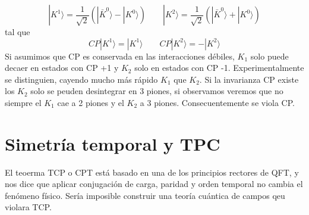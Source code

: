 \begin{equation}
   |K^1\rangle = \frac{1}{\sqrt{2}} (|\bar{K}^0 \rangle - |{K}^0 \rangle )  \qquad 
   |K^2\rangle = \frac{1}{\sqrt{2}} (|\bar{K}^0 \rangle + |{K}^0 \rangle ) 
\end{equation}
tal que 
\begin{equation}
   CP|K^1\rangle = |K^1\rangle  \qquad 
   CP|K^2\rangle = - |K^2\rangle
\end{equation}
Si asumimos que CP es conservada en las interacciones débiles, $K_1$ solo puede decaer en estados con CP +1 y $K_2$ solo en estados con CP -1. Experimentalmente se distinguien, cayendo mucho más rápido $K_1$ que $K_2$. Si la invarianza CP existe los $K_2$ solo se peuden desintegrar en 3 piones, si observamos veremos que no siempre el $K_1$ cae a 2 piones y el $K_2$ a 3 piones. Consecuentemente se viola CP. 


\section{Simetría temporal y TPC}

El teoerma TCP o CPT está basado en una de los principios rectores de QFT, y nos dice que aplicar conjugación de carga, paridad y orden temporal no cambia el fenómeno físico. Sería imposible construir una teoría cuántica de campos qeu violara TCP. 